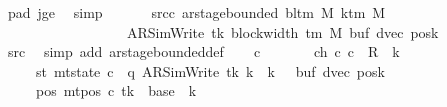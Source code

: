 \begin{isabellebody}
\ pad{}\ jge\ \isamarkupfalse%
\ simp\isanewline
\ \ \isamarkupfalse%
\isanewline
\ \ \isamarkupfalse%
\ src{\isacharunderscore}{\kern0pt}c{}{\isacharcolon}{\kern0pt}\ {\isachardoublequoteopen}ar{\isacharunderscore}{\kern0pt}stage{\isacharunderscore}{\kern0pt}bounded\ {\isacharparenleft}{\kern0pt}bl{\isacharunderscore}{\kern0pt}tm\ M{\isacharparenright}{\kern0pt}\ {\isacharparenleft}{\kern0pt}k{\isacharunderscore}{\kern0pt}tm\ M{\isacharparenright}{\kern0pt}\isanewline
\ \ \ \ \ \ \ \ \ \ \ \ \ \ \ \ \ \ {\isacharparenleft}{\kern0pt}AR{\isacharunderscore}{\kern0pt}SimWrite{\isacharcomma}{\kern0pt}\ tk{\isacharcomma}{\kern0pt}\ block{\isacharunderscore}{\kern0pt}width\ {\isacharparenleft}{\kern0pt}{\isasymGamma}{\isacharunderscore}{\kern0pt}tm\ M{\isacharparenright}{\kern0pt}{\isacharcomma}{\kern0pt}\ buf{\isacharcomma}{\kern0pt}\ dvec{\isacharcomma}{\kern0pt}\ posk{\isacharparenright}{\kern0pt}{\isachardoublequoteclose}\isanewline
\ \ \ \ \isamarkupfalse%
\ src{}\ \isamarkupfalse%
\ {\isacharparenleft}{\kern0pt}simp\ add{\isacharcolon}{\kern0pt}\ ar{\isacharunderscore}{\kern0pt}stage{\isacharunderscore}{\kern0pt}bounded{\isacharunderscore}{\kern0pt}def{\isacharparenright}{\kern0pt}\isanewline
\ \ \isamarkupfalse%
\ c{}\ \isanewline
\ \ \ \ \ \ ch{}{\isacharcolon}{\kern0pt}\ {\isachardoublequoteopen}{\isacharparenleft}{\kern0pt}c{}{\isacharcomma}{\kern0pt}\ c{}{\isacharparenright}{\kern0pt}\ {\isasymin}\ {\isacharquery}{\kern0pt}R\ {\isacharcircum}{\kern0pt}{\isacharcircum}{\kern0pt}\ {\isacharparenleft}{\kern0pt}{\isacharquery}{\kern0pt}k\ {\isacharminus}{\kern0pt}\ {}{\isacharparenright}{\kern0pt}{\isachardoublequoteclose}\isanewline
\ \ \ \ \ st{}{\isacharcolon}{\kern0pt}\ {\isachardoublequoteopen}mt{\isacharunderscore}{\kern0pt}state\ c{}\ {\isacharequal}{\kern0pt}\ {\isacharparenleft}{\kern0pt}q{\isacharcomma}{\kern0pt}\ AR{\isacharunderscore}{\kern0pt}SimWrite{\isacharcomma}{\kern0pt}\ tk{\isacharcomma}{\kern0pt}\ {\isacharquery}{\kern0pt}k\ {\isacharplus}{\kern0pt}\ {\isacharparenleft}{\kern0pt}{\isacharquery}{\kern0pt}k\ {\isacharminus}{\kern0pt}\ {}{\isacharparenright}{\kern0pt}{\isacharcomma}{\kern0pt}\ buf{\isacharcomma}{\kern0pt}\ dvec{\isacharcomma}{\kern0pt}\ posk{\isacharparenright}{\kern0pt}{\isachardoublequoteclose}\isanewline
\ \ \ \ \ pos{}{\isacharcolon}{\kern0pt}\ {\isachardoublequoteopen}mt{\isacharunderscore}{\kern0pt}pos\ c{}\ tk\ {\isacharequal}{\kern0pt}\ base\ {\isacharplus}{\kern0pt}\ {\isacharparenleft}{\kern0pt}{\isacharquery}{\kern0pt}k\ {\isacharminus}{\kern0pt}\ {}{\isacharparenright}{\kern0pt}{\isachardoublequoteclose}\isanewline

\end{isabellebody}
